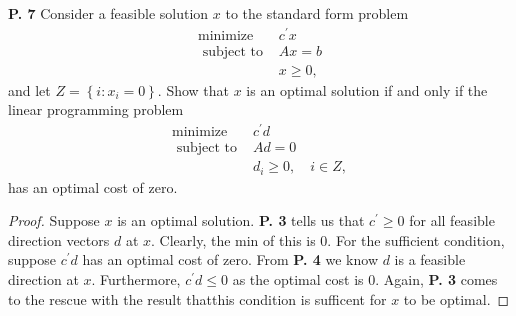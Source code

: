 \documentclass{article}
\begin{document}
\begin{jacklist}
\newpage
    \begin{framed} 
    \item [\textbf{P. 7}] Consider a feasible solution $x$ to the standard form problem 
        \begin{align*}
            \text{minimize } & c^{\prime} x \\
            \text { subject to } & A x=b \\
            & x \geq 0,
        \end{align*}
        and let $Z=\left\{i: x_{i}=0\right\}$. Show that $x$ is an optimal solution if and only if the linear programming problem
        \begin{align*}
            \text{minimize } & c^{\prime} d \\
            \text { subject to } & A d=0 \quad \\
            & d_{i} \geq 0, \quad i \in Z,
        \end{align*}
        has an optimal cost of zero.
    \end{framed}
    \begin{proof}
        Suppose $x$ is an optimal solution. \textbf{P. 3} tells us that $c^\prime \geq 0$ for all feasible direction vectors $d$ at $x$.
        Clearly, the min of this is 0. For the sufficient condition, suppose $c^\prime d$ has  an optimal cost of zero. From 
        \textbf{P. 4} we know $d$ is a feasible direction at $x$. Furthermore, $c^\prime d \leq 0$ as the optimal cost is 0. Again,
        \textbf{P. 3} comes to the rescue with the result thatthis condition is sufficent for $x$ to be optimal. 
    \end{proof}


\end{jacklist}
\end{document}
